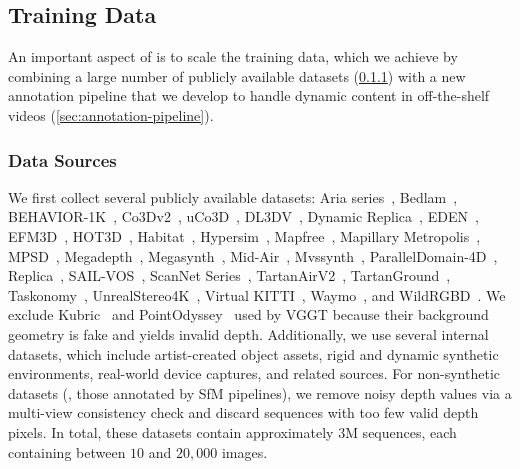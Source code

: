 \subsection{Training Data}%
\label{sec:data}




An important aspect of \method is to scale the training data, which we achieve by combining a large number of publicly available datasets (\cref{sec:data-sources}) with a new annotation pipeline that we develop to handle dynamic content in off-the-shelf videos (\cref{sec:annotation-pipeline}).

\subsubsection{Data Sources}%
\label{sec:data-sources}

We first collect several publicly available datasets:
Aria series~\cite{pan23aria},
Bedlam~\cite{black23bedlam:},
BEHAVIOR-1K~\cite{li24behavior-1k:},
Co3Dv2~\cite{reizenstein21common},
uCo3D~\cite{liu25uco3d},
DL3DV~\cite{ling23dl3dv-10k:},
Dynamic Replica~\cite{karaev23dynamicstereo},
EDEN~\cite{le21eden:},
EFM3D~\cite{straub24efm3d:},
HOT3D~\cite{banerjee24introducing},
Habitat~\cite{habitat19iccv},
Hypersim~\cite{roberts21hypersim:},
Mapfree~\cite{arnold22map-free},
Mapillary Metropolis~\cite{mapillary25metropolis},
MPSD~\cite{antequera20mapillary},
Megadepth~\cite{li18megadepth:},
Megasynth~\cite{jiang25megasynth:},
Mid-Air~\cite{fonder19mid-air:},
Mvssynth~\cite{huang18deepmvs:},
ParallelDomain-4D~\cite{hoorick24generative},
Replica~\cite{straub19the-replica},
SAIL-VOS~\cite{hu21sail-vos},
ScanNet Series~\cite{dai17scannet:, yeshwanth23scannet:},
TartanAirV2~\cite{wang20tartanair:},
TartanGround~\cite{patel25tartanground:},
Taskonomy~\cite{zamir18taskonomy:},
UnrealStereo4K~\cite{tosi21smd-nets:},
Virtual KITTI~\cite{cabon20virtual},
Waymo~\cite{sun20scalability}, and
WildRGBD~\cite{xia24rgbd}.
We exclude Kubric~\cite{greff22kubric:} and PointOdyssey~\cite{zheng23pointodyssey:} used by VGGT because their background geometry is fake and yields invalid depth.
Additionally, we use several internal datasets, which include artist-created object assets, rigid and dynamic synthetic environments, real-world device captures, and related sources.
For non-synthetic datasets (\eg, those annotated by SfM pipelines), we remove noisy depth values via a multi-view consistency check and discard sequences with too few valid depth pixels.
In total, these datasets contain approximately $3$M sequences, each containing between $10$ and $20{,}000$ images.

